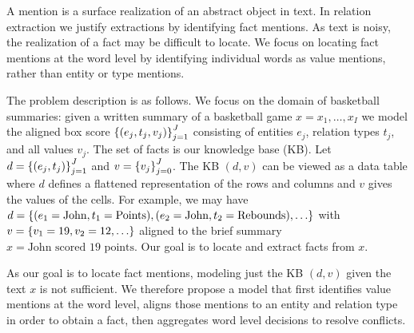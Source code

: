 \documentclass[12pt]{article}
\begin{document}
A mention is a surface realization of an abstract object in text.
In relation extraction we justify extractions by identifying fact mentions.
As text is noisy, the realization of a fact may be difficult to locate.
We focus on locating fact mentions at the word level by identifying
individual words as value mentions, rather than entity or type mentions.

\begin{comment}
Note on related work:
Except for \citet{zeng2018copy}, prior work has either assumed that the locations of
entities and values are given as input features or that the locations of entities and values
are observed at training time.
\end{comment}

The problem description is as follows.
We focus on the domain of basketball summaries:
given a written summary of a basketball game $x = x_1, \ldots, x_{I}$
we model the aligned box score $\left\{(e_j, t_j, v_j)\right\}_{j=1}^J$
consisting of entities $e_j$,
relation types $t_j$, and all values $v_j$.
The set of facts is our knowledge base (KB).
Let $d = \left\{(e_j, t_j)\right\}_{j=1}^J$ and $v = \left\{v_j\right\}_{j=0}^J$.
The KB $(d,v)$ can be viewed as a data table where
$d$ defines a flattened representation of the rows and columns and
$v$ gives the values of the cells.
For example, we may have
$
d = \left\{
    (e_1 = \textrm{John}, t_1 = \textrm{Points}),
    (e_2 = \textrm{John}, t_2 = \textrm{Rebounds}),
    \ldots
\right\}
$
with 
$ v = \left\{ v_1 = 19, v_2 = 12, \ldots \right\}$ 
aligned to the brief summary $x = \textrm{John scored 19 points}$.
Our goal is to locate and extract facts from $x$.

\begin{comment}
(move somewhere else)
We are primarily concerned with the scenario where we have an overcomplete KB schema with
respect to a specific passage of text.
This fits many scenarios in real world applications:
we may have many entity and type pairs in our data table,
but a summary may discuss only a small salient subset of players and statistics.
\end{comment}

As our goal is to locate fact mentions, modeling just the KB $(d,v)$ given the text $x$
is not sufficient.
We therefore propose a model that first identifies value mentions at the word level,
aligns those mentions to an entity and relation type in order to obtain a fact, 
then aggregates word level decisions to resolve conflicts.
\end{document}
